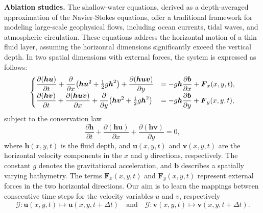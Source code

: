 \documentclass[preprint,numbers,sort&compress]{elsarticle}
\begin{document}
			
			\textbf{Ablation studies.}
			The shallow-water equations, derived as a depth-averaged approximation of the Navier-Stokes equations, offer a traditional framework for modeling large-scale geophysical flows, including ocean currents, tidal waves, and atmospheric circulation. These equations address the horizontal motion of a thin fluid layer, assuming the horizontal dimensions significantly exceed the vertical depth. In two spatial dimensions with external forces, the system is expressed as follows:
			\begin{equation*}
				\left\{
				\begin{array}{@{}l@{\quad}l@{}}
					\displaystyle
					\frac{\partial (\boldsymbol{h}\boldsymbol{u})}{\partial t} 
					+ \frac{\partial}{\partial x}\!\left( \boldsymbol{h}\boldsymbol{u}^2 + \tfrac{1}{2} g \boldsymbol{h}^2 \right) 
					+ \frac{\partial (\boldsymbol{h}\boldsymbol{u}\boldsymbol{v})}{\partial y}
					& \displaystyle = - g \boldsymbol{h}\frac{\partial \boldsymbol{b}}{\partial x} + \boldsymbol{F}_x(x,y,t),
					\\[1.2ex]
					\displaystyle
					\frac{\partial (\boldsymbol{h}\boldsymbol{v})}{\partial t} 
					+ \frac{\partial (\boldsymbol{h}\boldsymbol{u}\boldsymbol{v})}{\partial x} 
					+ \frac{\partial}{\partial y}\!\left( \boldsymbol{h}\boldsymbol{v}^2 + \tfrac{1}{2} g \boldsymbol{h}^2 \right) 
					& \displaystyle =  - g \boldsymbol{h}\frac{\partial \boldsymbol{b}}{\partial y} + \boldsymbol{F}_y(x,y,t),
				\end{array}
				\right.
			\end{equation*}
			subject to the conservation law
			\begin{equation*}
				\frac{\partial \boldsymbol{h}}{\partial t} + \frac{\partial (\boldsymbol{h}\boldsymbol{u})}{\partial x} + \frac{\partial (\boldsymbol{h}\boldsymbol{v})}{\partial y}  = 0,
			\end{equation*}
			where \( \boldsymbol{h}(x,y,t) \) is the fluid depth, and \( \boldsymbol{u}(x,y,t) \) and \( \boldsymbol{v}(x,y,t) \) are the horizontal velocity components in the \( x \) and \( y \) directions, respectively. The constant \( g \) denotes the gravitational acceleration, and \( \boldsymbol{b} \) describes a spatially varying bathymetry. The terms \( \boldsymbol{F}_x(x,y,t) \) and \( \boldsymbol{F}_y(x,y,t) \) represent external forces in the two horizontal directions. Our aim is to learn the mappings between consecutive time steps for the velocity variables $u$ and $v$, respectively
			\begin{equation*}
				\mathcal{G}: \boldsymbol{u}(x, y, t) \mapsto \boldsymbol{u}(x,y,t+\Delta t) \quad \text{and} \quad  \mathcal{G}: \boldsymbol{v}(x, y, t) \mapsto \boldsymbol{v}(x,y,t+\Delta t).
			\end{equation*}
\end{document}
